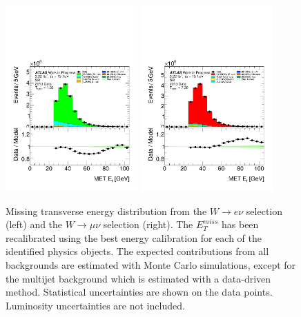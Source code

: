 \begin{figure}[htbp]
\centering
\includegraphics[width=0.45\textwidth]{figures/SR/dataMc-met_reco_et-SR-bkgQCD-el.pdf}
\includegraphics[width=0.45\textwidth]{figures/SR/dataMc-met_reco_et-SR-bkgQCD-mu.pdf}
\caption{
Missing transverse energy distribution from the $W \rightarrow e\nu$ selection (left) and the $W \rightarrow \mu\nu$ selection (right).
The $E_{T}^{miss}$ has been recalibrated using the best energy calibration for each of the identified physics objects.
The expected contributions from all backgrounds are estimated with Monte Carlo simulations, except for the multijet background which is estimated with a data-driven method. 
Statistical uncertainties are shown on the data points.
Luminosity uncertainties are not included.
}
\label{fig:SR_met_reco_et}
\end{figure}

